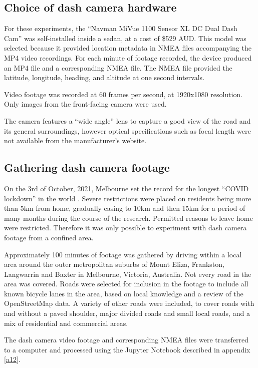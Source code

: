 \documentclass[11pt,twoside]{report}
\begin{document}
\subsection{Choice of dash camera hardware}
\label{s:rq3a}

For these experiments, the ``Navman MiVue 1100 Sensor XL DC Dual Dash Cam'' was self-installed inside a sedan, at a cost of \$529 AUD.  This model was selected because it provided location metadata in NMEA files accompanying the MP4 video recordings.  For each minute of footage recorded, the device produced an MP4 file and a corresponding NMEA file.  The NMEA file provided the latitude, longitude, heading, and altitude at one second intervals.

Video footage was recorded at 60 frames per second, at 1920x1080 resolution.  Only images from the front-facing camera were used.

The camera features a ``wide angle'' lens to capture a good view of the road and its general surroundings, however optical specifications such as focal length were not available from the manufacturer's website.


\subsection{Gathering dash camera footage}
\label{s:rq3b}

On the 3rd of October, 2021, Melbourne set the record for the longest ``COVID lockdown'' in the world \cite{lockdown_record}.  Severe restrictions were placed on residents being more than 5km from home, gradually easing to 10km and then 15km for a period of many months during the course of the research\cite{lockdown_5km}.  Permitted reasons to leave home were restricted.  Therefore it was only possible to experiment with dash camera footage from a confined area.

Approximately 100 minutes of footage was gathered by driving within a local area around the outer metropolitan suburbs of Mount Eliza, Frankston, Langwarrin and Baxter in Melbourne, Victoria, Australia.  Not every road in the area was covered.  Roads were selected for inclusion in the footage to include all known bicycle lanes in the area, based on local knowledge and a review of the OpenStreetMap data.  A variety of other roads were included, to cover roads with and without a paved shoulder, major divided roads and small local roads, and a mix of residential and commercial areas.

The dash camera video footage and corresponding NMEA files were transferred to a computer and processed using the Jupyter Notebook described in appendix \ref{a12}.
\end{document}
